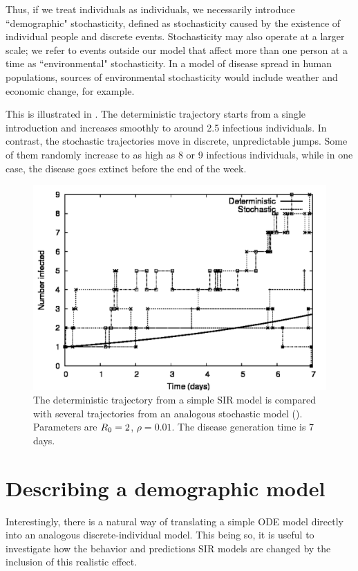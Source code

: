 \documentclass{amsproc}
\theoremstyle{definition}
\theoremstyle{remark}
\numberwithin{equation}{section}
\begin{document}
Thus, if we treat individuals as individuals, we necessarily introduce ``demographic" stochasticity, defined as stochasticity caused by the existence of individual people and discrete events.   Stochasticity may also operate at a larger scale; we refer to events outside our model that affect more than one person at a time as ``environmental" stochasticity.  In a model of disease spread in human populations, sources of environmental stochasticity would include weather and economic change, for example.

This is illustrated in .  The deterministic trajectory starts from a single introduction and increases smoothly to around 2.5 infectious individuals.  In contrast, the stochastic trajectories move in discrete, unpredictable jumps.  Some of them randomly increase to as high as 8 or 9 infectious individuals, while in one case, the disease goes extinct before the end of the week.

\begin{figure}
\includegraphics[width=\figwidth]{inputs/stochcomp.pdf}
\caption[Demographic spread]{
%
	The deterministic trajectory from a simple SIR model  is compared with several trajectories from an analogous stochastic model ().  Parameters are $R_0=2$, $\rho=0.01$.  The disease generation time is 7 days.
%
}
\end{figure}

\section{Describing a demographic model}

Interestingly, there is a natural way of translating a simple ODE model directly into an analogous discrete-individual model.  
This being so, it is useful to investigate how the behavior and predictions SIR models are changed by the inclusion of this realistic effect.
\end{document}
